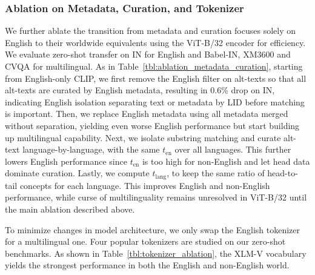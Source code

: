 \subsubsection{Ablation on Metadata, Curation, and Tokenizer}
\label{sec:ablation_metadata_curation_tokenizer}
We further ablate the transition from metadata and curation focuses solely on English to their worldwide equivalents using the ViT-B/32 encoder for efficiency.
We evaluate zero-shot transfer on IN for English and Babel-IN, XM3600 and CVQA for multilingual. As in Table~\ref{tbl:ablation_metadata_curation}, starting from English-only CLIP, we first remove the English filter on alt-texts so that all alt-texts are curated by English metadata, resulting in 0.6\% drop on IN, indicating English isolation separating text or metadata by LID before matching is important. Then, we replace English metadata using all metadata merged without separation, yielding even worse English performance but start building up multilingual capability. Next, we isolate substring matching and curate alt-text language-by-language, with the same $t_\text{en}$ over all languages. This further lowers English performance since $t_\text{en}$ is too high for non-English and let head data dominate curation.
Lastly, we compute $t_\text{lang}$, to keep the same ratio of head-to-tail concepts for each language. This improves English and non-English performance, while curse of multilinguality remains unresolved in ViT-B/32 until the main ablation described above.

To minimize changes in model architecture, we only swap the English tokenizer for a multilingual one. Four popular tokenizers are studied on our zero-shot benchmarks. As shown in Table~\ref{tbl:tokenizer_ablation}, the XLM-V vocabulary yields the strongest performance in both the English and non-English world.

